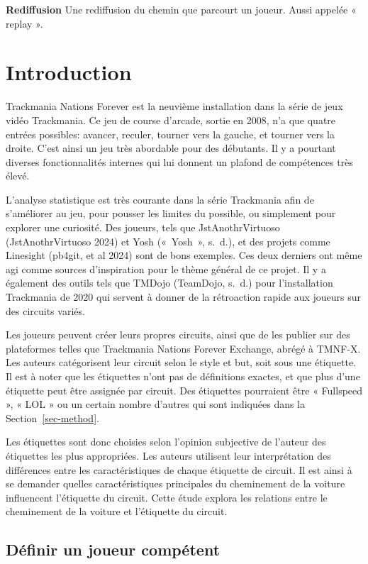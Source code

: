 \documentclass[
  oneside,
  open=any]{scrreprt}
\begin{document}
\quad

\textbf{Rediffusion}\quad{} Une rediffusion du chemin que parcourt un
joueur. Aussi appelée « replay ».

\chapter{Introduction}\label{sec-intro}

Trackmania Nations Forever est la neuvième installation dans la série de
jeux vidéo Trackmania. Ce jeu de course d'arcade, sortie en 2008, n'a
que quatre entrées possibles: avancer, reculer, tourner vers la gauche,
et tourner vers la droite. C'est ainsi un jeu très abordable pour des
débutants. Il y a pourtant diverses fonctionnalités internes qui lui
donnent un plafond de compétences très élevé.

L'analyse statistique est très courante dans la série Trackmania afin de
s'améliorer au jeu, pour pousser les limites du possible, ou simplement
pour explorer une curiosité. Des joueurs, tels que JstAnothrVirtuoso
(JstAnothrVirtuoso 2024) et Yosh ({«~Yosh~»}, s.~d.), et des projets
comme Linesight (pb4git, et al 2024) sont de bons exemples. Ces deux
derniers ont même agi comme sources d'inspiration pour le thème général
de ce projet. Il y a également des outils tels que TMDojo (TeamDojo,
s.~d.) pour l'installation Trackmania de 2020 qui servent à donner de la
rétroaction rapide aux joueurs sur des circuits variés.

Les joueurs peuvent créer leurs propres circuits, ainsi que de les
publier sur des plateformes telles que Trackmania Nations Forever
Exchange, abrégé à TMNF-X. Les auteurs catégorisent leur circuit selon
le style et but, soit sous une étiquette. Il est à noter que les
étiquettes n'ont pas de définitions exactes, et que plus d'une étiquette
peut être assignée par circuit. Des étiquettes pourraient être «
Fullspeed », « LOL » ou un certain nombre d'autres qui sont indiquées
dans la Section~\ref{sec-method}.

Les étiquettes sont donc choisies selon l'opinion subjective de l'auteur
des étiquettes les plus appropriées. Les auteurs utilisent leur
interprétation des différences entre les caractéristiques de chaque
étiquette de circuit. Il est ainsi à se demander quelles
caractéristiques principales du cheminement de la voiture influencent
l'étiquette du circuit. Cette étude explora les relations entre le
cheminement de la voiture et l'étiquette du circuit.

\section{Définir un joueur compétent}\label{sec-competent}
\end{document}

